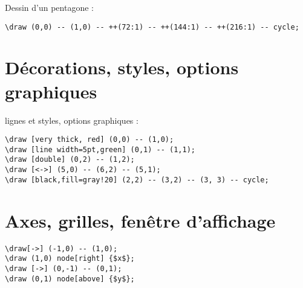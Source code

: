 \bigskip
Dessin d'un pentagone :
\begin{verbatim}
\draw (0,0) -- (1,0) -- ++(72:1) -- ++(144:1) -- ++(216:1) -- cycle;
\end{verbatim}



\newpage
\section{Décorations, styles, options graphiques}
lignes et styles, options graphiques :

\begin{verbatim}
\draw [very thick, red] (0,0) -- (1,0);
\draw [line width=5pt,green] (0,1) -- (1,1);
\draw [double] (0,2) -- (1,2);
\draw [<->] (5,0) -- (6,2) -- (5,1);
\draw [black,fill=gray!20] (2,2) -- (3,2) -- (3, 3) -- cycle;
\end{verbatim}





%



\newpage
\section{Axes, grilles, fenêtre d'affichage}

\begin{verbatim}
\draw[->] (-1,0) -- (1,0);
\draw (1,0) node[right] {$x$};
\draw [->] (0,-1) -- (0,1);
\draw (0,1) node[above] {$y$};
\end{verbatim}

